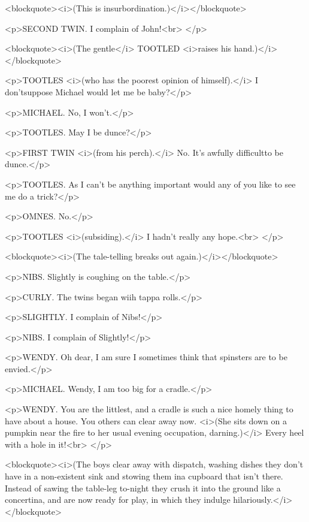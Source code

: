 <blockquote><i>(This is insurbordination.)</i></blockquote>

<p>SECOND TWIN. I complain of John!<br>
</p>

<blockquote><i>(The gentle</i> TOOTLED <i>raises his
hand.)</i></blockquote>

<p>TOOTLES <i>(who has the poorest opinion of himself).</i> I
don'tsuppose Michael would let me be baby?</p>

<p>MICHAEL. No, I won't.</p>

<p>TOOTLES. May I be dunce?</p>

<p>FIRST TWIN <i>(from his perch).</i> No. It's awfully difficultto
be dunce.</p>

<p>TOOTLES. As I can't be anything important would any of you like to
see me do a trick?</p>

<p>OMNES. No.</p>

<p>TOOTLES <i>(subsiding).</i> I hadn't really any hope.<br>
</p>

<blockquote><i>(The tale-telling breaks out again.)</i></blockquote>

<p>NIBS. Slightly is coughing on the table.</p>

<p>CURLY. The twins began wiih tappa rolls.</p>

<p>SLIGHTLY. I complain of Nibs!</p>

<p>NIBS. I complain of Slightly!</p>

<p>WENDY. Oh dear, I am sure I sometimes think that spinsters are to
be envied.</p>

<p>MICHAEL. Wendy, I am too big for a cradle.</p>

<p>WENDY. You are the littlest, and a cradle is such a nice homely
thing to have about a house. You others can clear away now. <i>(She
sits down on a pumpkin near the fire to her usual evening occupation,
darning.)</i> Every heel with a hole in it!<br>
</p>

<blockquote><i>(The boys clear away with dispatch, washing dishes
they don't have in a non-existent sink and stowing them ina cupboard
that isn't there. Instead of sawing the table-leg to-night they crush
it into the ground like a concertina, and are now ready for play, in
which they indulge hilariously.</i></blockquote>

